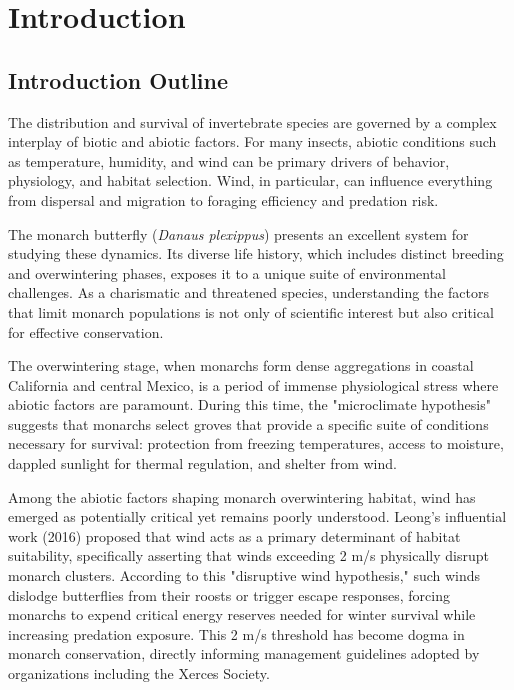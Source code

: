\usepackage{hyperref}
\usepackage{longtable}

\chapter{Introduction}
\label{ch:introduction}

\section{Introduction Outline}

The distribution and survival of invertebrate species are governed by a complex interplay of biotic and abiotic factors. For many insects, abiotic conditions such as temperature, humidity, and wind can be primary drivers of behavior, physiology, and habitat selection. Wind, in particular, can influence everything from dispersal and migration to foraging efficiency and predation risk.

The monarch butterfly (\textit{Danaus plexippus}) presents an excellent system for studying these dynamics. Its diverse life history, which includes distinct breeding and overwintering phases, exposes it to a unique suite of environmental challenges. As a charismatic and threatened species, understanding the factors that limit monarch populations is not only of scientific interest but also critical for effective conservation.

The overwintering stage, when monarchs form dense aggregations in coastal California and central Mexico, is a period of immense physiological stress where abiotic factors are paramount. During this time, the "microclimate hypothesis" suggests that monarchs select groves that provide a specific suite of conditions necessary for survival: protection from freezing temperatures, access to moisture, dappled sunlight for thermal regulation, and shelter from wind.

Among the abiotic factors shaping monarch overwintering habitat, wind has emerged as potentially critical yet remains poorly understood. Leong's influential work (2016) proposed that wind acts as a primary determinant of habitat suitability, specifically asserting that winds exceeding 2 m/s physically disrupt monarch clusters. According to this "disruptive wind hypothesis," such winds dislodge butterflies from their roosts or trigger escape responses, forcing monarchs to expend critical energy reserves needed for winter survival while increasing predation exposure. This 2 m/s threshold has become dogma in monarch conservation, directly informing management guidelines adopted by organizations including the Xerces Society.

